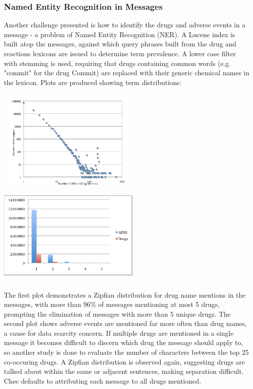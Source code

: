 \documentclass[twoside,11pt]{article}
\begin{document}
\subsubsection{Named Entity Recognition in Messages}
Another challenge presented is how to identify the drugs and adverse events in a message - a problem of Named Entity Recognition (NER). A Lucene index is built atop the messages, against which query phrases built from the drug and reactions lexicons are issued to determine term prevalence. A lower case filter with stemming is used, requiring that drugs containing common words (e.g. "commit" for the drug Commit) are replaced with their generic chemical names in the lexicon. Plots are produced showing term distributions:

\includegraphics[width=7cm, height=5cm]{Figure-1-Zipfian.png}
\includegraphics[width=7cm, height=5cm]{Figure-2-AERS_Drugs.png}

The first plot demonstrates a Zipfian distribution for drug name mentions in the messages, with more than 96\% of messages mentioning at most 5 drugs, prompting the elimination of messages with more than 5 unique drugs. The second plot shows adverse events are mentioned far more often than drug names, a cause for data scarcity concern. If multiple drugs are mentioned in a single message it becomes difficult to discern which drug the message should apply to, so another study is done to evaluate the number of characters between the top 25 co-occuring drugs. A Zipfian distribution is observed again, suggesting drugs are talked about within the same or adjacent sentences, making separation difficult. Chee defaults to attributing each message to all drugs mentioned.
\end{document}
